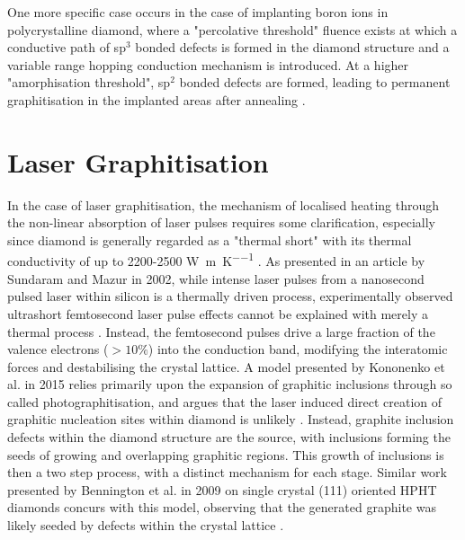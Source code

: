 One more specific case occurs in the case of implanting boron ions in polycrystalline diamond, where a "percolative threshold" fluence exists at which a conductive path of sp$^{3}$ bonded defects is formed in the diamond structure and a variable range hopping conduction mechanism is introduced. At a higher "amorphisation threshold", sp$^{2}$ bonded defects are formed, leading to permanent graphitisation in the implanted areas after annealing \cite{fontaine:1995}.

\section{Laser Graphitisation}
In the case of laser graphitisation, the mechanism of localised heating through the non-linear absorption of laser pulses requires some clarification, especially since diamond is generally regarded as a "thermal short" with its thermal conductivity of up to 2200-2500 \si{\watt\per\metre\per\kelvin} \cite{graebner:1995}. As presented in an article by Sundaram and Mazur in 2002, while intense laser pulses from a nanosecond pulsed laser within silicon is a thermally driven process, experimentally observed ultrashort femtosecond laser pulse effects cannot be explained with merely a thermal process \cite{sundaram:2002}. Instead, the femtosecond pulses drive a large fraction of the valence electrons ($>10\%$) into the conduction band, modifying the interatomic forces and destabilising the crystal lattice. A model presented by Kononenko et al. in 2015 relies primarily upon the expansion of graphitic inclusions through so called photographitisation, and argues that the laser induced direct creation of graphitic nucleation sites within diamond is unlikely \cite{kononenko:2015}. Instead, graphite inclusion defects within the diamond structure are the source, with inclusions forming the seeds of growing and overlapping graphitic regions. This growth of inclusions is then a two step process, with a distinct mechanism for each stage. Similar work presented by Bennington et al. in 2009 on single crystal (111) oriented HPHT diamonds concurs with this model, observing that the generated graphite was likely seeded by defects within the crystal lattice \cite{bennington:2009}.

